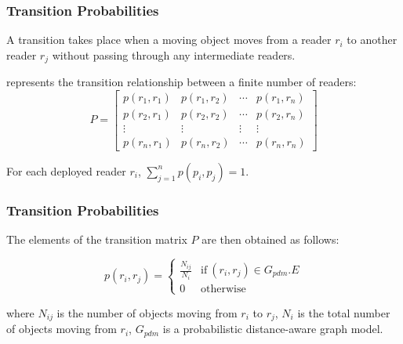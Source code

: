 \begin{frame}
\frametitle{Transition Probabilities}

\begin{definition}[Transition]
  A transition takes place when a moving object moves from a reader $r_i$ to another reader $r_j$ without passing through any intermediate readers.
\end{definition}

\vspace{10pt}

 represents the transition relationship between a finite number of readers:
\begin{equation}
  P = \begin{bmatrix}
p(r_1, r_1) & p(r_1, r_2) & \cdots & p(r_1, r_n)\\
p(r_2, r_1) & p(r_2, r_2) & \cdots & p(r_2, r_n)\\
\vdots & \vdots & \vdots & \vdots\\
p(r_n, r_1) & p(r_n, r_2) & \cdots & p(r_n, r_n)
\end{bmatrix}
\end{equation}

\vspace{5pt}

For each deployed reader $r_i$, $\sum_{j=1}^{n}p(p_i,p_j) = 1$.

\end{frame}


\begin{frame}
\frametitle{Transition Probabilities}

The elements of the transition matrix $P$ are then obtained as follows:

\vspace{10pt}

\begin{equation}
  p(r_i, r_j) = \left\{\begin{matrix}
\frac{N_{ij}}{N_i} & \text{if}~(r_i, r_j) \in G_{pdm}.E\\
0 & \text{otherwise}
\end{matrix}\right.
\end{equation}

\vspace{10pt}

where $N_{ij}$ is the number of objects moving from $r_i$ to $r_j$, $N_i$ is the total number of objects moving from $r_i$, $G_{pdm}$ is a probabilistic distance-aware graph model.

\end{frame}

